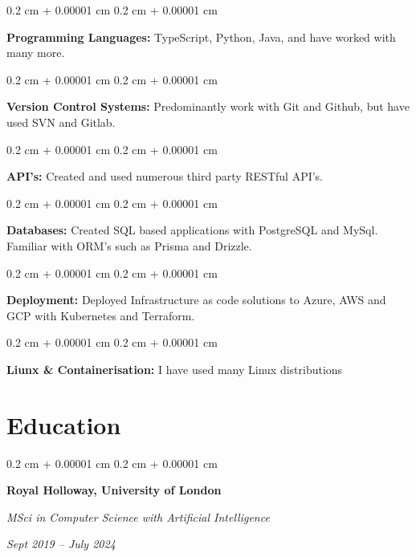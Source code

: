 \documentclass[10pt, letterpaper]{article}
\newenvironment{onecolentry}{
    \begin{adjustwidth}{
        0.2 cm + 0.00001 cm
    }{
        0.2 cm + 0.00001 cm
    }
}{
    \end{adjustwidth}
} %
\newenvironment{twocolentry}[2][]{
    \onecolentry
    \def\secondColumn{#2}
    \setcolumnwidth{\fill, 4.5 cm}
    \begin{paracol}{2}
}{
    \switchcolumn \raggedleft \secondColumn
    \end{paracol}
    \endonecolentry
} %
\begin{document}
        
        \begin{onecolentry}
            \textbf{Programming Languages:} TypeScript, Python, Java, and have worked with many more.
        \end{onecolentry}

        \vspace{0.2 cm}

        \begin{onecolentry}
            \textbf{Version Control Systems:} Predominantly work with Git and Github, but have used SVN and Gitlab.
        \end{onecolentry}

        \vspace{0.2 cm}

        \begin{onecolentry}
            \textbf{API's:} Created and used numerous third party RESTful API's.
        \end{onecolentry}

        \vspace{0.2 cm}

        \begin{onecolentry}
            \textbf{Databases:} Created SQL based applications with PostgreSQL and MySql. Familiar with ORM's such as Prisma and Drizzle.
        \end{onecolentry}

        \vspace{0.2 cm}

        \begin{onecolentry}
            \textbf{Deployment:} Deployed Infrastructure as code solutions to Azure, AWS and GCP with Kubernetes and Terraform.
        \end{onecolentry}

        \vspace{0.2 cm}

        \begin{onecolentry}
            \textbf{Liunx \& Containerisation:} I have used many Linux distributions
        \end{onecolentry}


    
    \section{Education}



        
        \begin{twocolentry}{
            
            
        \textit{Sept 2019 – July 2024}}
            \textbf{Royal Holloway, University of London}

            \textit{MSci in Computer Science with Artificial Intelligence}
        \end{twocolentry}
\end{document}
